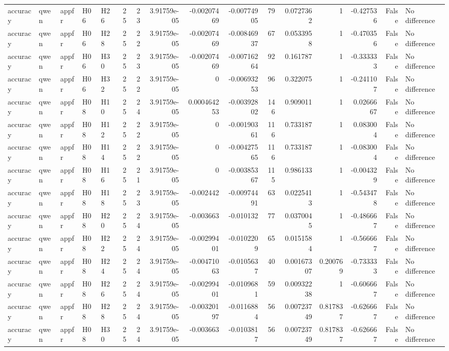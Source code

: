 \begin{longtable}{lllllrrrrrrrrrrl}
accuracy & qwen & appfr & H06 & H26 & 25 & 23 & 3.91759e-05 & -0.00207469 & -0.00774905 & 79 & 0.0727362 & 1 & -0.427536 & False & No difference \\
accuracy & qwen & appfr & H06 & H28 & 25 & 22 & 3.91759e-05 & -0.00207469 & -0.00846937 & 67 & 0.0533958 & 1 & -0.470356 & False & No difference \\
accuracy & qwen & appfr & H06 & H30 & 25 & 23 & 3.91759e-05 & -0.00207469 & -0.00716264 & 92 & 0.161787 & 1 & -0.333333 & False & No difference \\
accuracy & qwen & appfr & H06 & H32 & 25 & 22 & 3.91759e-05 & 0 & -0.00693253 & 96 & 0.322075 & 1 & -0.241107 & False & No difference \\
accuracy & qwen & appfr & H08 & H10 & 25 & 24 & 3.91759e-05 & 0.000464253 & -0.00392802 & 146 & 0.909011 & 1 & 0.0266667 & False & No difference \\
accuracy & qwen & appfr & H08 & H12 & 25 & 22 & 3.91759e-05 & 0 & -0.00190361 & 116 & 0.733187 & 1 & 0.083004 & False & No difference \\
accuracy & qwen & appfr & H08 & H14 & 25 & 22 & 3.91759e-05 & 0 & -0.00427565 & 116 & 0.733187 & 1 & -0.083004 & False & No difference \\
accuracy & qwen & appfr & H08 & H16 & 25 & 21 & 3.91759e-05 & 0 & -0.00385367 & 115 & 0.986133 & 1 & -0.004329 & False & No difference \\
accuracy & qwen & appfr & H08 & H18 & 25 & 23 & 3.91759e-05 & -0.002442 & -0.00974491 & 63 & 0.0225413 & 1 & -0.543478 & False & No difference \\
accuracy & qwen & appfr & H08 & H20 & 25 & 24 & 3.91759e-05 & -0.003663 & -0.010132 & 77 & 0.0370045 & 1 & -0.486667 & False & No difference \\
accuracy & qwen & appfr & H08 & H22 & 25 & 24 & 3.91759e-05 & -0.00299401 & -0.0102209 & 65 & 0.0151584 & 1 & -0.566667 & False & No difference \\
accuracy & qwen & appfr & H08 & H24 & 25 & 24 & 3.91759e-05 & -0.00471063 & -0.0105637 & 40 & 0.00167307 & 0.200769 & -0.733333 & False & No difference \\
accuracy & qwen & appfr & H08 & H26 & 25 & 24 & 3.91759e-05 & -0.00299401 & -0.0109681 & 59 & 0.00932238 & 1 & -0.606667 & False & No difference \\
accuracy & qwen & appfr & H08 & H28 & 25 & 24 & 3.91759e-05 & -0.00320197 & -0.0116884 & 56 & 0.00723749 & 0.817837 & -0.626667 & False & No difference \\
accuracy & qwen & appfr & H08 & H30 & 25 & 24 & 3.91759e-05 & -0.003663 & -0.0103817 & 56 & 0.00723749 & 0.817837 & -0.626667 & False & No difference \\

\end{longtable}
